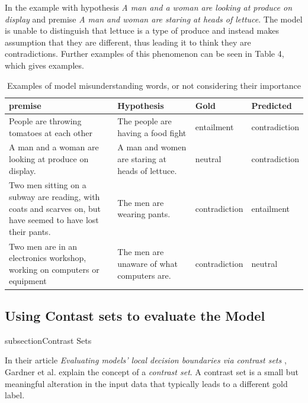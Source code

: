 \documentclass[twocolumn]{article}
\begin{document}
In the example with hypothesis \textit{A man and a woman are looking at produce
on display} and premise \textit{A man and woman are staring at heads of
lettuce}. The model is unable to distinguish that lettuce is a type of produce
and instead makes assumption that they are different, thus leading it to think
they are contradictions. Further examples of this phenomenon can be seen in
Table 4, which gives examples.

\begin{table}[t]
\caption{Examples of model misunderstanding words, or not considering their importance}
\begin{tabular}{|p{4cm}|p{4cm}|p{2.5cm}|p{2.5cm}|}
\hline
\textbf{premise}                                                                        & \textbf{Hypothesis}                & \textbf{Gold} & \textbf{Predicted} \\ \hline
People are throwing tomatoes at each other                                                                    & The people are having a food fight               & entailment                         & contradiction      \\ \hline
A man and a woman are looking at produce on display.                                                          & A man and women are staring at heads of lettuce. & neutral                            & contradiction      \\ \hline
Two men sitting on a subway are reading, with coats and scarves on, but have seemed to have lost their pants. & The men are wearing pants.                       & contradiction                      & entailment         \\ \hline
Two men are in an electronics workshop, working on computers or equipment                                     & The men are unaware of what computers are.       & contradiction                      & neutral            \\ \hline
\end{tabular}
\end{table}


\subsection{Using Contast sets to evaluate the Model}
subsection{Contrast Sets}

In their article \textit{Evaluating models' local decision boundaries via
contrast sets} \cite{gardner2020evaluating}, Gardner et al. explain the concept
of a \textit{contrast set}. A contrast set is a small but meaningful alteration
in the input data that typically leads to a different gold label.
\end{document}
